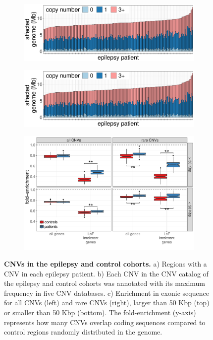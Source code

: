 \begin{figure}[!h]
  \centering
  \begin{subfigure}[b]{.49\textwidth}
    \includegraphics[width=\linewidth, page=1]{figures/epilepsy-CNVnumbers.pdf}
    \caption{}
    \label{fig:cnvs}
  \end{subfigure}
  \begin{subfigure}[b]{.49\textwidth}
    \includegraphics[width=\linewidth, page=3]{figures/epilepsy-CNVnumbers.pdf}
    \caption{}
    \label{fig:cnvfreq}
  \end{subfigure}
  \medskip
  
  \begin{subfigure}[b]{.9\textwidth}
    \includegraphics[width=\linewidth,page=1]{figures/epilepsy-enrichmentPatterns.pdf}
    \caption{}
    \label{fig:exenr}
  \end{subfigure}
  \caption[CNVs in the epilepsy and control cohorts.]{{\bf CNVs in the epilepsy and control cohorts.} {\small a) Regions with a CNV in each epilepsy patient. b) Each CNV in the CNV catalog of the epilepsy and control cohorts was annotated with its maximum frequency in five CNV databases. c) Enrichment in exonic sequence for all CNVs (left) and rare CNVs (right), larger than 50 Kbp (top) or smaller than 50 Kbp (bottom). The fold-enrichment (y-axis) represents how many CNVs overlap coding sequences compared to control regions randomly distributed in the genome.}}
\end{figure}

